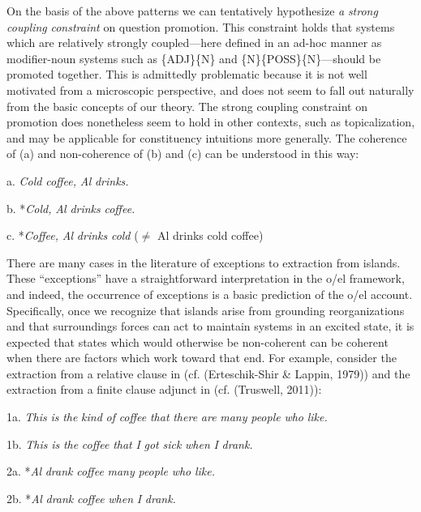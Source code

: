   On the basis of the above patterns we can tentatively hypothesize \textit{a} \textit{strong} \textit{coupling} \textit{constraint} on question promotion. This constraint holds that systems which are relatively strongly coupled—here defined in an ad-hoc manner as modifier-noun systems such as \{ADJ\}\{N\} and \{N\}\{POSS\}\{N\}—should be promoted together. This is admittedly problematic because it is not well motivated from a microscopic perspective, and does not seem to fall out naturally from the basic concepts of our theory. The strong coupling constraint on promotion does nonetheless seem to hold in other contexts, such as topicalization, and may be applicable for constituency intuitions more generally. The coherence of (a) and non-coherence of (b) and (c) can be understood in this way:

  a.  \textit{Cold} \textit{coffee,} \textit{Al} \textit{drinks.}

  b.  *\textit{Cold,} \textit{Al} \textit{drinks} \textit{coffee.}

  c.  *\textit{Coffee,} \textit{Al} \textit{drinks} \textit{cold}  (${\neq}$ Al drinks cold coffee)

  There are many cases in the literature of exceptions to extraction from islands. These “exceptions” have a straightforward interpretation in the o/el framework, and indeed, the occurrence of exceptions is a basic prediction of the o/el account. Specifically, once we recognize that islands arise from grounding reorganizations and that surroundings forces can act to maintain systems in an excited state, it is expected that states which would otherwise be non-coherent can be coherent when there are factors which work toward that end. For example, consider the extraction from a relative clause in  (cf. (Erteschik-Shir \& Lappin, 1979)) and the extraction from a finite clause adjunct in  (cf. (Truswell, 2011)):

  1a. \textit{This} \textit{is} \textit{the} \textit{kind} \textit{of} \textit{coffee} \textit{that} \textit{there} \textit{are} \textit{many} \textit{people} \textit{who} \textit{like.}

  1b. \textit{This} \textit{is} \textit{the} \textit{coffee} \textit{that} \textit{I} \textit{got} \textit{sick} \textit{when} \textit{I} \textit{drank.}

  2a. *\textit{Al} \textit{drank} \textit{coffee} \textit{many} \textit{people} \textit{who} \textit{like.}

  2b. *\textit{Al} \textit{drank} \textit{coffee} \textit{when} \textit{I} \textit{drank.}

